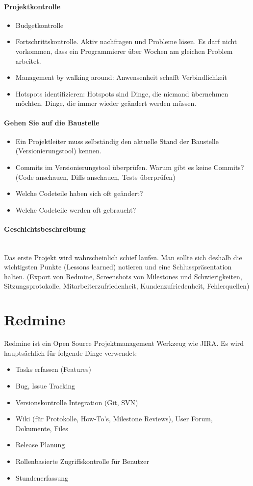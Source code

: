 \paragraph{Projektkontrolle} \hfill
\begin{itemize}
	\item Budgetkontrolle
	\item Fortschrittskontrolle. Aktiv nachfragen und Probleme lösen. Es darf nicht vorkommen, dass ein Programmierer über Wochen am gleichen Problem arbeitet.
	\item Management by walking around: Anwensenheit schafft Verbindlichkeit
	\item Hotspots identifizieren: Hotspots sind Dinge, die niemand übernehmen möchten. Dinge, die immer wieder geändert werden müssen.
\end{itemize}

\paragraph{Gehen Sie auf die Baustelle} \hfill
\begin{itemize}
	\item Ein Projektleiter muss selbständig den aktuelle Stand der Baustelle (Versionierungstool) kennen.
	\item Commits im Versionierungstool überprüfen. Warum gibt es keine Commits? (Code anschauen, Diffs anschauen, Tests überprüfen)
	\item Welche Codeteile haben sich oft geändert?
	\item Welche Codeteile werden oft gebraucht?
\end{itemize}

\paragraph{Geschichtsbeschreibung} \hfill \\
Das erste Projekt wird wahrscheinlich schief laufen. Man sollte sich deshalb die wichtigsten Punkte (Lessons learned) notieren und eine Schlusspräsentation halten. (Export von Redmine, Screenshots von Milestones und Schwierigkeiten, Sitzungsprotokolle, Mitarbeiterzufriedenheit, Kundenzufriedenheit, Fehlerquellen)

 
\section{Redmine}
Redmine ist ein Open Source Projektmanagement Werkzeug wie JIRA. Es wird hauptsächlich für folgende Dinge verwendet:
\begin{itemize}
	\item Tasks erfassen (Features)
	\item Bug, Issue Tracking
	\item Versionskontrolle Integration (Git, SVN)
	\item Wiki (für Protokolle, How-To's, Milestone Reviews), User Forum, Dokumente, Files
	\item Release Planung
	\item Rollenbasierte Zugriffskontrolle für Benutzer
	\item Stundenerfassung
\end{itemize}

